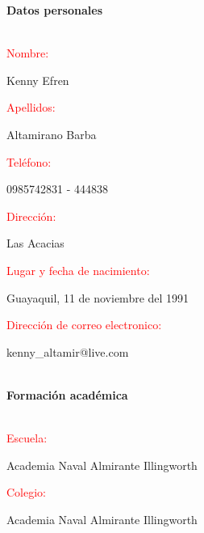 \documentclass[20pt]{article}
\begin{document}
\begin{center}
\begin{huge}
\textbf{Datos personales}\\\
\end{huge}
\end{center}

\begin{large}
\textcolor{red}{Nombre:}
\end{large}
Kenny Efren\\

\begin{large}
\textcolor{red}{Apellidos:}
\end{large}
Altamirano Barba\\

\begin{large}
\textcolor{red}{Teléfono:}
\end{large}
0985742831 - 444838\\

\begin{large}
\textcolor{red}{Dirección:}
\end{large}
Las Acacias\\

\begin{large}
\textcolor{red}{Lugar y fecha de nacimiento:}
\end{large}
Guayaquil, 11 de noviembre del 1991\\

\begin{large}
\textcolor{red}{Dirección de correo electronico:}
\end{large}
kenny\_altamir@live.com\\\\


\begin{center}
\begin{huge}
\textbf{Formación académica}\\\
\end{huge}
\end{center}


\begin{large}
\textcolor{red}{Escuela:}
\end{large}
Academia Naval Almirante Illingworth\\

\begin{large}
\textcolor{red}{Colegio:}
\end{large}
Academia Naval Almirante Illingworth\\
\end{document}
